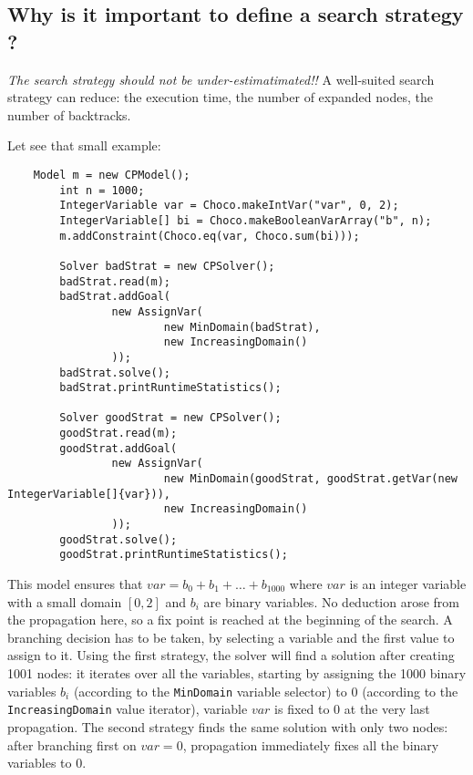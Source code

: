 \subsection{Why is it important to define a search strategy ?}\label{solver:whyisitimportanttodefineasearchstrategy}\hypertarget{solver:whyisitimportanttodefineasearchstrategy}{}

\begin{note}
\emph{The search strategy should not be under-estimatimated!!}
A well-suited search strategy can reduce: the execution time, the number of expanded nodes, the number of backtracks.
\end{note}
Let see that small example:
\begin{lstlisting}
	Model m = new CPModel();
        int n = 1000;
        IntegerVariable var = Choco.makeIntVar("var", 0, 2);
        IntegerVariable[] bi = Choco.makeBooleanVarArray("b", n);
        m.addConstraint(Choco.eq(var, Choco.sum(bi)));

        Solver badStrat = new CPSolver();
        badStrat.read(m);
        badStrat.addGoal(
                new AssignVar(
                        new MinDomain(badStrat), 
                        new IncreasingDomain()
                ));
        badStrat.solve();
        badStrat.printRuntimeStatistics();

        Solver goodStrat = new CPSolver();
        goodStrat.read(m);
        goodStrat.addGoal(
                new AssignVar(
                        new MinDomain(goodStrat, goodStrat.getVar(new IntegerVariable[]{var})), 
                        new IncreasingDomain()
                ));
        goodStrat.solve();
        goodStrat.printRuntimeStatistics();
\end{lstlisting}

This model ensures that $var = b_{0} + b_{1} + \ldots + b_{1000}$ where $var$ is an integer variable with a small domain $[0,2]$ and $b_{i}$ are binary variables. No deduction arose from the propagation here, so a fix point is reached at the beginning of the search. A branching decision has to be taken, by selecting a variable and the first value to assign to it. Using the first strategy, the solver will find a solution after creating 1001 nodes: it iterates over all the variables, starting by assigning the 1000 binary variables $b_i$ (according to the \texttt{MinDomain} variable selector) to $0$ (according to the \texttt{IncreasingDomain} value iterator), variable $var$ is fixed to $0$ at the very last propagation. The second strategy finds the same solution with only two nodes: after branching first on $var=0$, propagation immediately fixes all the binary variables to $0$. 

